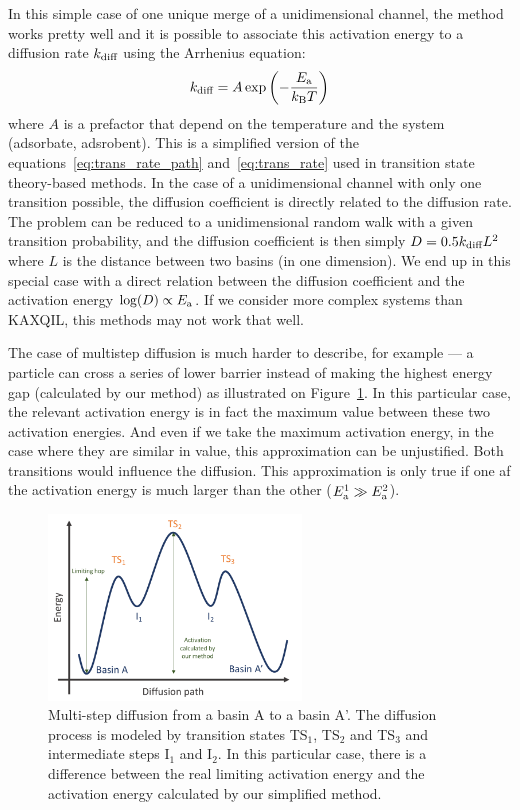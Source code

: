 \documentclass[main]{subfiles}
\begin{document}
In this simple case of one unique merge of a unidimensional channel, the method works pretty well and it is possible to associate this activation energy to a diffusion rate $k_{\text{diff}}$ using the Arrhenius equation:
\begin{equation}
  k_{\text{diff}} = A \exp\left(-\frac{E_{\text{a}}}{k_{\text{B}}T}\right)
\end{equation}
where $A$ is a prefactor that depend on the temperature and the system (adsorbate, adsrobent). This is a simplified version of the equations~\ref{eq:trans_rate_path} and~\ref{eq:trans_rate} used in transition state theory-based methods. In the case of a unidimensional channel with only one transition possible, the diffusion coefficient is directly related to the diffusion rate. The problem can be reduced to a unidimensional random walk with a given transition probability, and the diffusion coefficient is then simply $D=0.5k_{\text{diff}}L^2$ where $L$ is the distance between two basins (in one dimension). We end up in this special case with a direct relation between the diffusion coefficient and the activation energy $\log(D)\propto E_{\text{a}}$.
If we consider more complex systems than KAXQIL, this methods may not work that well. 

The case of multistep diffusion is much harder to describe, for example --- a particle can cross a series of lower barrier instead of making the highest energy gap (calculated by our method) as illustrated on Figure~\ref{fgr:TS_problem}. In this particular case, the relevant activation energy is in fact the maximum value between these two activation energies. And even if we take the maximum activation energy, in the case where they are similar in value, this approximation can be unjustified. Both transitions would influence the diffusion. This approximation is only true if one af the activation energy is much larger than the other ($E_{\text{a}}^1 \gg E_{\text{a}}^2$).

\begin{figure}[ht]
  \centering
    \includegraphics[width=0.6\textwidth]{figures/5-diffusion/Diffusion_TS.pdf}
    \caption{Multi-step diffusion from a basin A to a basin A'. The diffusion process is modeled by transition states TS$_1$, TS$_2$ and TS$_3$ and intermediate steps I$_1$ and I$_2$. In this particular case, there is a difference between the real limiting activation energy and the activation energy calculated by our simplified method. }\label{fgr:TS_problem}
\end{figure}
\end{document}
